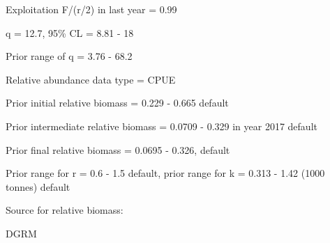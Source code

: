 \documentclass[12pt,a4paper]{article}\usepackage[]{graphicx}\usepackage[]{xcolor}
\begin{document}
Exploitation F/(r/2) in last year = 0.99

q = 12.7, 95\% CL = 8.81 - 18

Prior range of q = 3.76 - 68.2

Relative abundance data type = CPUE

Prior initial relative biomass = 0.229 - 0.665 default

Prior intermediate relative biomass = 0.0709 - 0.329 in year 2017 default

Prior final relative biomass = 0.0695 - 0.326, default

Prior range for r = 0.6 - 1.5 default, prior range for k = 0.313 - 1.42 (1000 tonnes) default

Source for relative biomass: 

DGRM

    
\end{document}
